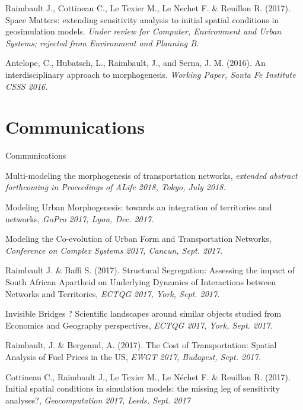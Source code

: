 \bigskip

\noindent Raimbault J., Cottineau C., Le Texier M., Le Nechet F. \& Reuillon R.
 (2017). Space Matters: extending sensitivity analysis to initial spatial conditions in geosimulation models. \textit{Under review for Computer, Environment and Urban Systems; rejected from Environment and Planning B.}

\bigskip

\noindent Antelope, C., Hubatsch, L., Raimbault, J., and Serna, J. M. (2016). An interdisciplinary approach to morphogenesis. \textit{Working Paper, Santa Fe Institute CSSS 2016.}





\section*{Communications}{Communications}


\noindent Multi-modeling the morphogenesis of transportation networks, \textit{extended abstract forthcoming in Proceedings of ALife 2018, Tokyo, July 2018.}


\bigskip



\noindent Modeling Urban Morphogenesis: towards an integration of territories and networks, \textit{GoPro 2017, Lyon, Dec. 2017.}


\bigskip


\noindent Modeling the Co-evolution of Urban Form and Transportation Networks, \textit{Conference on Complex Systems 2017, Cancun, Sept. 2017.}

\bigskip

\noindent Raimbault J. \& Baffi S. (2017). Structural Segregation: Assessing the impact of South African Apartheid on Underlying Dynamics of Interactions between Networks and Territories, \textit{ECTQG 2017, York, Sept. 2017.}


\bigskip


\noindent Invisible Bridges ? Scientific landscapes around similar objects studied from Economics and Geography perspectives, \textit{ECTQG 2017, York, Sept. 2017.}


\bigskip


\noindent Raimbault, J. \& Bergeaud, A. (2017). The Cost of Transportation: Spatial Analysis of Fuel Prices in the US, \textit{EWGT 2017, Budapest, Sept. 2017.}

\bigskip


\noindent Cottineau C., Raimbault J., Le Texier M., Le N{\'e}chet F. \& Reuillon R. (2017). Initial spatial conditions in simulation models: the missing leg of sensitivity analyses?, \textit{Geocomputation 2017, Leeds, Sept. 2017}

